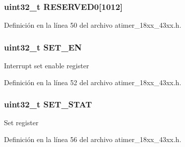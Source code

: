 \subsubsection[{\texorpdfstring{R\+E\+S\+E\+R\+V\+E\+D0}{RESERVED0}}]{ uint32\+\_\+t R\+E\+S\+E\+R\+V\+E\+D0\mbox{[}1012\mbox{]}}\hypertarget{struct_l_p_c___a_t_i_m_e_r___t_aa30fe60f09b5291251c6166bca12b9aa}{}\label{struct_l_p_c___a_t_i_m_e_r___t_aa30fe60f09b5291251c6166bca12b9aa}


Definición en la línea 50 del archivo atimer\+\_\+18xx\+\_\+43xx.\+h.

\subsubsection[{\texorpdfstring{S\+E\+T\+\_\+\+EN}{SET_EN}}]{ uint32\+\_\+t S\+E\+T\+\_\+\+EN}\hypertarget{struct_l_p_c___a_t_i_m_e_r___t_ad4ee2600dffc97b5487b479978433ed0}{}\label{struct_l_p_c___a_t_i_m_e_r___t_ad4ee2600dffc97b5487b479978433ed0}
Interrupt set enable register 

Definición en la línea 52 del archivo atimer\+\_\+18xx\+\_\+43xx.\+h.

\subsubsection[{\texorpdfstring{S\+E\+T\+\_\+\+S\+T\+AT}{SET_STAT}}]{ uint32\+\_\+t S\+E\+T\+\_\+\+S\+T\+AT}\hypertarget{struct_l_p_c___a_t_i_m_e_r___t_aa392d0314798880efcc1243457aad369}{}\label{struct_l_p_c___a_t_i_m_e_r___t_aa392d0314798880efcc1243457aad369}
Set register 

Definición en la línea 56 del archivo atimer\+\_\+18xx\+\_\+43xx.\+h.

